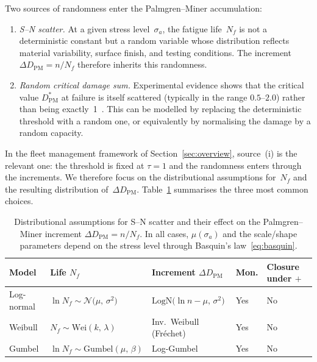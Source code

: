 \documentclass[11pt,a4paper]{article}
\theoremstyle{plain}
\theoremstyle{definition}
\theoremstyle{remark}
\begin{document}
Two sources of randomness enter the Palmgren--Miner accumulation:
\begin{enumerate}[label=(\roman*)]
  \item \emph{S--N scatter.}
    At a given stress level~$\sigma_a$, the fatigue life~$N_f$ is not a deterministic constant but a random variable whose distribution reflects material variability, surface finish, and testing conditions.
    The increment $\Delta D_{\mathrm{PM}} = n/N_f$ therefore inherits this randomness.
  \item \emph{Random critical damage sum.}
    Experimental evidence shows that the critical value $D_{\mathrm{PM}}^*$ at failure is itself scattered (typically in the range $0.5$--$2.0$) rather than being exactly~1~\cite{Shen1980}.
    This can be modelled by replacing the deterministic threshold with a random one, or equivalently by normalising the damage by a random capacity.
\end{enumerate}
In the fleet management framework of Section~\ref{sec:overview}, source~(i) is the relevant one: the threshold is fixed at $\tau = 1$ and the randomness enters through the increments.
We therefore focus on the distributional assumptions for~$N_f$ and the resulting distribution of~$\Delta D_{\mathrm{PM}}$.
Table~\ref{tab:sn_scatter} summarises the three most common choices.

\begin{table}[htbp]
\centering
\caption{Distributional assumptions for S--N scatter and their effect on the Palmgren--Miner increment $\Delta D_{\mathrm{PM}} = n/N_f$.
In all cases, $\mu(\sigma_a)$ and the scale/shape parameters depend on the stress level through Basquin's law~\eqref{eq:basquin}.}
\label{tab:sn_scatter}
\small
\begin{tabular}{@{}p{2.1cm}p{3.4cm}p{3.5cm}p{1.2cm}p{3.0cm}@{}}
\toprule
\textbf{Model} & \textbf{Life} $N_f$ & \textbf{Increment} $\Delta D_{\mathrm{PM}}$ & \textbf{Mon.} & \textbf{Closure under $+$} \\
\midrule
Log-normal
  & $\ln N_f \sim \mathcal{N}\!\bigl(\mu,\,\sigma^2\bigr)$
  & $\mathrm{LogN}\!\bigl(\ln n {-} \mu,\,\sigma^2\bigr)$
  & Yes
  & No \\[4pt]
Weibull
  & $N_f \sim \mathrm{Wei}(k,\,\lambda)$
  & Inv.\ Weibull (Fr\'echet)
  & Yes
  & No \\[4pt]
Gumbel
  & $\ln N_f \sim \mathrm{Gumbel}(\mu,\,\beta)$
  & Log-Gumbel
  & Yes
  & No \\
\bottomrule
\end{tabular}
\end{table}
\end{document}
